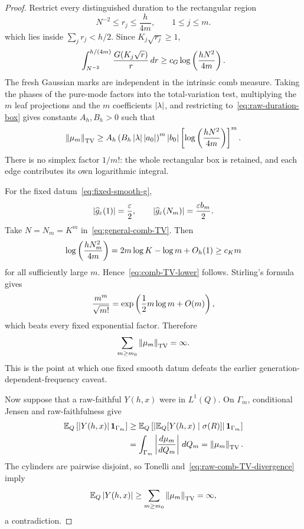 \begin{proof}
Restrict every distinguished duration to the rectangular region
\begin{equation}
  N^{-2}
  \leq r_j\leq\frac h{4m},
  \qquad 1\leq j\leq m.
  \label{eq:raw-duration-box}
\end{equation}
which lies inside $\sum_jr_j<h/2$. Since $K_j\sqrt{r_j}\geq1$,
\begin{equation*}
  \int_{N^{-2}}^{h/(4m)}
  \frac{G(K_j\sqrt r)}r\,dr
  \geq
  c_G\log\left(\frac{hN^2}{4m}\right).
\end{equation*}
The fresh Gaussian marks are independent in the intrinsic comb measure. Taking the phases of the pure-mode factors into the total-variation test, multiplying the $m$ leaf projections and the $m$ coefficients $\left|\lambda\right|$, and restricting to~\eqref{eq:raw-duration-box} gives constants $A_h,B_h>0$ such that
\begin{equation}
  \left\lVert\mu_m\right\rVert_{\mathrm{TV}}
  \geq
  A_h
  \left(B_h\left|\lambda\right|\left|a_0\right|\right)^m
  \left|b_0\right|
  \left[\log\left(\frac{hN^2}{4m}\right)\right]^m.
  \label{eq:general-comb-TV}
\end{equation}
There is no simplex factor $1/m!$: the whole rectangular box is retained, and each edge contributes its own logarithmic integral.

For the fixed datum~\eqref{eq:fixed-smooth-g},
\begin{equation*}
  \left|\widehat g_\varepsilon(1)\right|
  =\frac\varepsilon2,
  \qquad
  \left|\widehat g_\varepsilon(N_m)\right|
  =\frac{\varepsilon b_m}{2}.
\end{equation*}
Take $N=N_m=K^m$ in~\eqref{eq:general-comb-TV}. Then
\begin{equation*}
  \log\left(\frac{hN_m^2}{4m}\right)
  =
  2m\log K-\log m+O_h(1)
  \geq
  c_Km
\end{equation*}
for all sufficiently large $m$. Hence~\eqref{eq:comb-TV-lower} follows. Stirling's formula gives
\begin{equation*}
  \frac{m^m}{\sqrt{m!}}
  =
  \exp\left(\frac12m\log m+O(m)\right),
\end{equation*}
which beats every fixed exponential factor. Therefore
\begin{equation}
  \sum_{m\geq m_0}\left\lVert\mu_m\right\rVert_{\mathrm{TV}}
  =\infty.
  \label{eq:raw-comb-TV-divergence}
\end{equation}
This is the point at which one fixed smooth datum defeats the earlier generation-dependent-frequency caveat.

Now suppose that a raw-faithful $Y(h,x)$ were in $L^1(Q)$. On $\Gamma_m$, conditional Jensen and raw-faithfulness give
\begin{align*}
  \mathbb E_Q\left[\left|Y(h,x)\right|\mathbf 1_{\Gamma_m}\right]
  &\geq
  \mathbb E_Q\left[
    \left|\mathbb E_Q[Y(h,x)\mid\sigma(R)]\right|
    \mathbf 1_{\Gamma_m}
  \right] \\
  &=
  \int_{\Gamma_m}
  \left|\frac{d\mu_m}{dQ_m}\right|\,dQ_m
  =
  \left\lVert\mu_m\right\rVert_{\mathrm{TV}}.
\end{align*}
The cylinders are pairwise disjoint, so Tonelli and~\eqref{eq:raw-comb-TV-divergence} imply
\begin{equation*}
  \mathbb E_Q\left|Y(h,x)\right|
  \geq
  \sum_{m\geq m_0}\left\lVert\mu_m\right\rVert_{\mathrm{TV}}
  =\infty,
\end{equation*}
a contradiction.


\end{proof}
